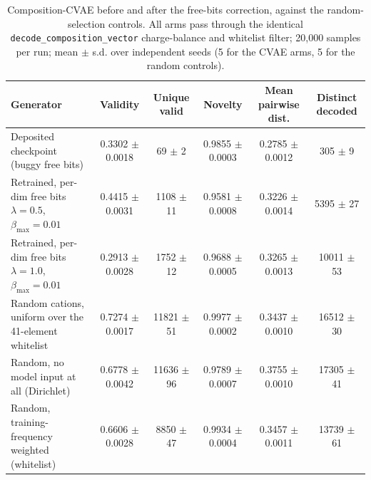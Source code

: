 \begin{table}[t]
\centering
\caption{Composition-CVAE before and after the free-bits correction, against the random-selection controls. All arms pass through the identical \texttt{decode\_composition\_vector} charge-balance and whitelist filter; 20{,}000 samples per run; mean $\pm$ s.d. over independent seeds (5 for the CVAE arms, 5 for the random controls).}
\label{tab:a8_headline}
\begin{tabular}{lccccc}
\toprule
Generator & Validity & Unique valid & Novelty & Mean pairwise dist. & Distinct decoded \\
\midrule
Deposited checkpoint (buggy free bits) & 0.3302 $\pm$ 0.0018 & 69 $\pm$ 2 & 0.9855 $\pm$ 0.0003 & 0.2785 $\pm$ 0.0012 & 305 $\pm$ 9 \\
Retrained, per-dim free bits $\lambda=0.5$, $\beta_{\max}=0.01$ & 0.4415 $\pm$ 0.0031 & 1108 $\pm$ 11 & 0.9581 $\pm$ 0.0008 & 0.3226 $\pm$ 0.0014 & 5395 $\pm$ 27 \\
Retrained, per-dim free bits $\lambda=1.0$, $\beta_{\max}=0.01$ & 0.2913 $\pm$ 0.0028 & 1752 $\pm$ 12 & 0.9688 $\pm$ 0.0005 & 0.3265 $\pm$ 0.0013 & 10011 $\pm$ 53 \\
\midrule
Random cations, uniform over the 41-element whitelist & 0.7274 $\pm$ 0.0017 & 11821 $\pm$ 51 & 0.9977 $\pm$ 0.0002 & 0.3437 $\pm$ 0.0010 & 16512 $\pm$ 30 \\
Random, no model input at all (Dirichlet) & 0.6778 $\pm$ 0.0042 & 11636 $\pm$ 96 & 0.9789 $\pm$ 0.0007 & 0.3755 $\pm$ 0.0010 & 17305 $\pm$ 41 \\
Random, training-frequency weighted (whitelist) & 0.6606 $\pm$ 0.0028 & 8850 $\pm$ 47 & 0.9934 $\pm$ 0.0004 & 0.3457 $\pm$ 0.0011 & 13739 $\pm$ 61 \\
\bottomrule
\end{tabular}
\end{table}

